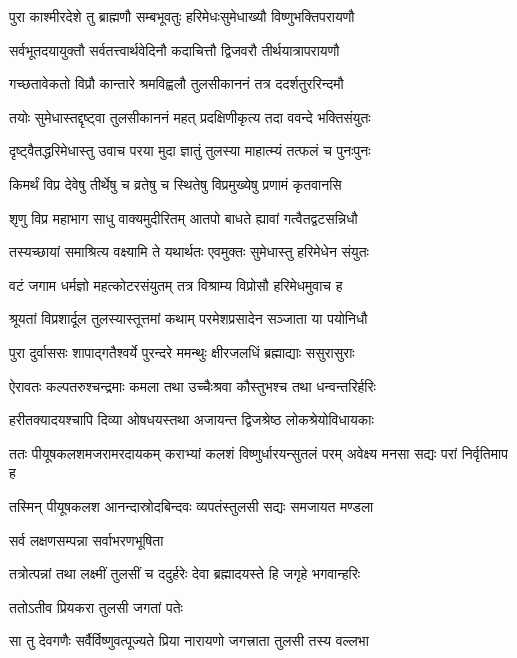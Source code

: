\twolineshloka
{पुरा काश्मीरदेशे तु ब्राह्मणौ सम्बभूवतुः}
{हरिमेधःसुमेधाख्यौ विष्णुभक्तिपरायणौ} %

\twolineshloka
{सर्वभूतदयायुक्तौ सर्वतत्त्वार्थवेदिनौ}
{कदाचित्तौ द्विजवरौ तीर्थयात्रापरायणौ} %

\twolineshloka
{गच्छतावेकतो विप्रौ कान्तारे श्रमविह्वलौ}
{तुलसीकाननं तत्र ददर्शतुररिन्दमौ} %

\twolineshloka
{तयोः सुमेधास्तद्दृष्ट्वा तुलसीकाननं महत्}
{प्रदक्षिणीकृत्य तदा ववन्दे भक्तिसंयुतः} %

\twolineshloka
{दृष्ट्वैतद्धरिमेधास्तु उवाच परया मुदा}
{ज्ञातुं तुलस्या माहात्म्यं तत्फलं च पुनःपुनः} %

\twolineshloka
{किमर्थं विप्र देवेषु तीर्थेषु च व्रतेषु च}
{स्थितेषु विप्रमुख्येषु प्रणामं कृतवानसि} %


\twolineshloka
{शृणु विप्र महाभाग साधु वाक्यमुदीरितम्}
{आतपो बाधते ह्यावां गत्वैतद्वटसन्निधौ} %

\twolineshloka
{तस्यच्छायां समाश्रित्य वक्ष्यामि ते यथार्थतः}
{एवमुक्तः सुमेधास्तु हरिमेधेन संयुतः} %

\twolineshloka
{वटं जगाम धर्मज्ञो महत्कोटरसंयुतम्}
{तत्र विश्राम्य विप्रोसौ हरिमेधमुवाच ह} %

\twolineshloka
{श्रूयतां विप्रशार्दूल तुलस्यास्तूत्तमां कथाम्}
{परमेशप्रसादेन सञ्जाता या पयोनिधौ} %

\twolineshloka
{पुरा दुर्वाससः शापाद्गतैश्वर्ये पुरन्दरे}
{ममन्थुः क्षीरजलधिं ब्रह्माद्याः ससुरासुराः} %

\twolineshloka
{ऐरावतः कल्पतरुश्चन्द्रमाः कमला तथा}
{उच्चैःश्रवा कौस्तुभश्च तथा धन्वन्तरिर्हरिः} %

\twolineshloka
{हरीतक्यादयश्चापि दिव्या ओषधयस्तथा}
{अजायन्त द्विजश्रेष्ठ लोकश्रेयोविधायकाः} %

\threelineshloka
{ततः पीयूषकलशमजरामरदायकम्}
{कराभ्यां कलशं विष्णुर्धारयन्सुतलं परम्}
{अवेक्ष्य मनसा सद्यः परां निर्वृतिमाप ह} %

\twolineshloka
{तस्मिन् पीयूषकलश आनन्दास्रोदबिन्दवः}
{व्यपतंस्तुलसी सद्यः समजायत मण्डला} %


\onelineshloka
{सर्व लक्षणसम्पन्ना सर्वाभरणभूषिता} %

\twolineshloka
{तत्रोत्पन्नां तथा लक्ष्मीं तुलसीं च ददुर्हरेः}
{देवा ब्रह्मादयस्ते हि जगृहे भगवान्हरिः} %


\onelineshloka
{ततोऽतीव प्रियकरा तुलसी जगतां पतेः} %

\twolineshloka
{सा तु देवगणैः सर्वैर्विष्णुवत्पूज्यते प्रिया}
{नारायणो जगत्त्राता तुलसी तस्य वल्लभा} %

